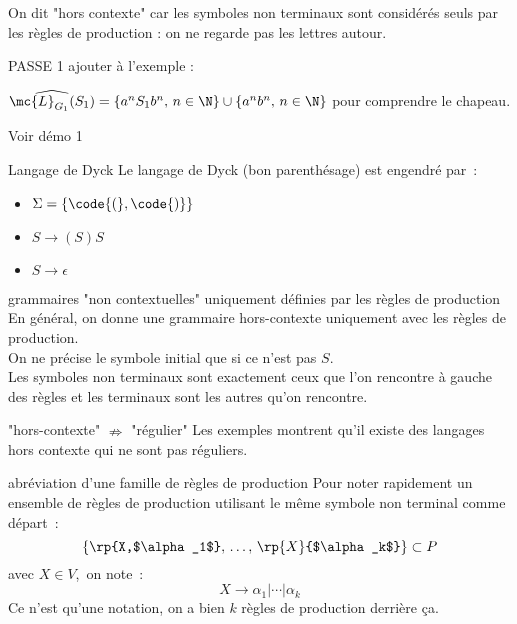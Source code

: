 \begin{adjustwidth}{-3cm}{-3cm}
\begin{remarque}{}{}
    On dit "hors contexte" car les symboles non terminaux sont considérés seuls par les règles de production : on ne regarde pas les lettres autour.
\end{remarque}



PASSE 1
ajouter à l'exemple : 

$\widehat{\mc{L}_{G_1}(S_1)} = \{a^n S_1 b^n,\, n \in \N\} \cup \{a^n b^n ,\, n \in \N\}$ pour comprendre le chapeau.


Voir démo 1

\begin{exemple}{}{Langage de Dyck}
    Le langage de Dyck (bon parenthésage) est engendré par~:
    \begin{itemize}
        \item $\Sigma = \{\code{(}, \code{)}\}$
        \item $S \rightarrow {(S)S}$
        \item $S \rightarrow \epsilon$
    \end{itemize}
\end{exemple}

\begin{remarque}{}{grammaires "non contextuelles" uniquement définies par les règles de production}
    En général, on donne une grammaire hors-contexte uniquement avec les règles de production.\\
    On ne précise le symbole initial que si ce n'est pas $S$.\\
    Les symboles non terminaux sont exactement ceux que l'on rencontre à gauche des règles et les terminaux sont les autres qu'on rencontre.
\end{remarque}

\begin{remarque}{}{"hors-contexte" $\nRightarrow$ "régulier"}
    Les exemples montrent qu'il existe des langages hors contexte qui ne sont pas réguliers.
\end{remarque}

\begin{remarque}{}{abréviation d'une famille de règles de production}
    Pour noter rapidement un ensemble de règles de production utilisant le même symbole non terminal comme départ~:
    $$\{\rp{X,$\alpha_1$},\, \dots,\, \rp{X}{$\alpha_k$}\} \subset P$$
    avec $X\in V$,\, on note~:
    $$X \rightarrow \alpha_1 \vert \cdots \vert \alpha_k$$
    Ce n'est qu'une notation, on a bien $k$ règles de production derrière ça.
\end{remarque}


\end{adjustwidth}
